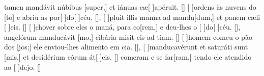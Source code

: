 {  %
  {tamen mandávit núbibus [super,] et iánuas cæ[ ]{a}{pé}ruit. [\LinkLA]}%
    {[ ]{or}dens às nuvens do [to] e abriu as por[ ]{do}[ ]{céu}. [\LinkPT]},
  {[ ]{plu}it illis manna ad mandu[dum,] et panem cæli [ ]{e}is. [\LinkLA]}%
    {[ ]{cho}ver sobre eles o maná, para co[rem,] e deu-lhes o [ ]{do}[ ]{céu}. [\LinkPT]},
  { angelórum manducávit [mo,] cibária misit eis ad tiam. [\LinkLA]}%
    {[ ]{ho}mem comeu o pão dos [jos;] ele enviou-lhes alimento em cia. [\LinkPT]},
  {[ ]{man}ducavérunt et saturáti sunt [mis,] et desidérium eórum át[ ]{e}is. [\LinkLA]}%
    { comeram e se far[ram,] tendo ele atendido ao [ ]{de}jo. [\LinkPT]}
}